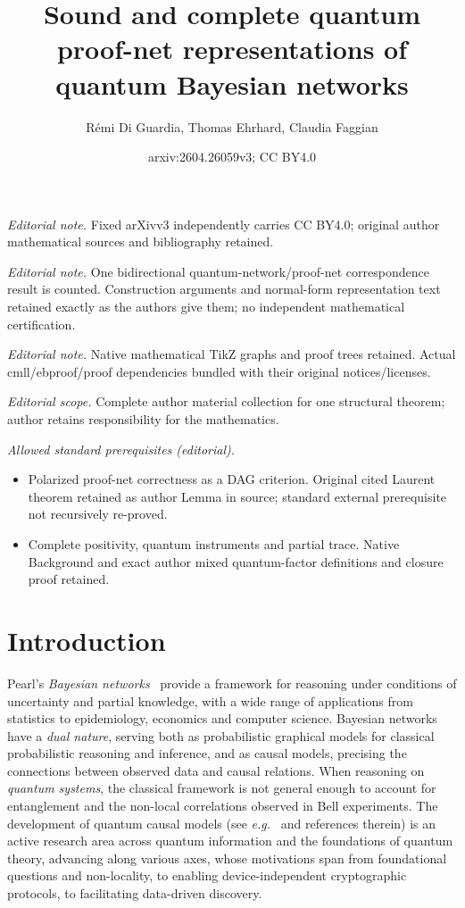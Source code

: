 \documentclass[10pt,a4paper]{article}
\title{Sound and complete quantum proof-net representations of quantum Bayesian networks}
\author{Rémi Di Guardia, Thomas Ehrhard, Claudia Faggian}
\date{arxiv:2604.26059v3; CC BY4.0}
\newcommand*{\eg}{\emph{e.g.}\xspace}
\begin{document}
\maketitle
\noindent\textit{Editorial note.} Fixed arXivv3 independently carries CC BY4.0; original author mathematical sources and bibliography retained.\par\medskip
\noindent\textit{Editorial note.} One bidirectional quantum-network/proof-net correspondence result is counted. Construction arguments and normal-form representation text retained exactly as the authors give them; no independent mathematical certification.\par\medskip
\noindent\textit{Editorial note.} Native mathematical TikZ graphs and proof trees retained. Actual cmll/ebproof/proof dependencies bundled with their original notices/licenses.\par\medskip
\noindent\textit{Editorial scope.} Complete author material collection for one structural theorem; author retains responsibility for the mathematics.\par\medskip
\noindent\textit{Allowed standard prerequisites (editorial).}\begin{itemize}
\item Polarized proof-net correctness as a DAG criterion. Original cited Laurent theorem retained as author Lemma in source; standard external prerequisite not recursively re-proved.
\item Complete positivity, quantum instruments and partial trace. Native Background and exact author mixed quantum-factor definitions and closure proof retained.
\end{itemize}\medskip

\section{Introduction}

Pearl's \emph{Bayesian networks}~\cite{Pearl86,Pearl_book} provide a framework for reasoning under conditions of uncertainty and partial knowledge, with a wide range of applications from statistics to epidemiology, economics and computer science.
Bayesian networks have a \emph{dual nature}, serving both as probabilistic graphical models for classical probabilistic reasoning and inference, and as causal models, precising the connections between observed data and causal relations.
When reasoning on \emph{quantum systems}, the classical framework is not general enough to account for entanglement and the non-local correlations observed in Bell experiments.
The development of quantum causal models (see \eg~\cite{BarrettLorenzOreshkov2019} and references therein) is an active research area across quantum information and the foundations of quantum theory, advancing along various axes, whose motivations span from foundational questions and non-locality, to enabling device-independent cryptographic protocols, to facilitating data-driven discovery.
\end{document}
